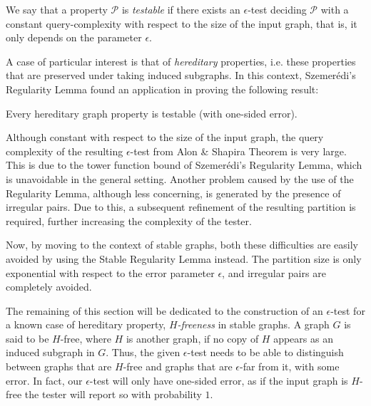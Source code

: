     \begin{definition}
        We say that a property $\mathcal{P}$ is \emph{testable} if there exists an $\epsilon$-test deciding $\mathcal{P}$
        with a constant query-complexity with respect to the size of the input graph, that is, it only depends on the
        parameter $\epsilon$.
    \end{definition}

    A case of particular interest is that of \emph{hereditary} properties, i.e. these properties that are preserved under
    taking induced subgraphs.
    In this context, Szemer\'edi's Regularity Lemma found an application in proving the following result:

    \begin{theorem}
        Every hereditary graph property is testable (with one-sided error).
    \end{theorem}

    Although constant with respect to the size of the input graph, the query complexity of the resulting $\epsilon$-test
    from Alon \& Shapira Theorem is very large.
    This is due to the tower function bound of Szemer\'edi's Regularity Lemma, which is unavoidable in the general setting.
    Another problem caused by the use of the Regularity Lemma, although less concerning, is generated by the presence of
    irregular pairs.
    Due to this, a subsequent refinement of the resulting partition is required, further increasing the complexity
    of the tester.

    Now, by moving to the context of stable graphs, both these difficulties are easily avoided by using the
    Stable Regularity Lemma instead.
    The partition size is only exponential with respect to the error parameter $\epsilon$, and irregular pairs are
    completely avoided. 

    The remaining of this section will be dedicated to the construction of an $\epsilon$-test for a known case
    of hereditary property, \emph{$H$-freeness} in stable graphs.
    A graph $G$ is said to be $H$-free, where $H$ is another graph, if no copy of $H$ appears as an induced subgraph in $G$.
    Thus, the given $\epsilon$-test needs to be able to distinguish between graphs that are $H$-free and graphs that
    are $\epsilon$-far from it, with some error.
    In fact, our $\epsilon$-test will only have one-sided error, as if the input graph is $H$-free the tester will
    report so with probability $1$.

